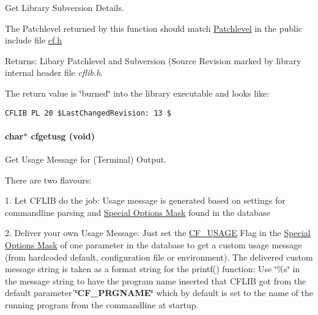 Get Library Subversion Details. 

The Patchlevel returned by this function should match \hyperlink{group__cflib__core_g0beb5d41f2b506f1c969c56731bb9490}{Patchlevel} in the public include file \hyperlink{cf_8h}{cf.h}

\begin{Desc}
\item[Returns:]Libary Patchlevel and Subversion (Source Revision marked by library internal header file {\em cflib.h\/}.\end{Desc}
The return value is \char`\"{}burned\char`\"{} into the library executable and looks like: 

\footnotesize\begin{verbatim}CFLIB PL 20 $LastChangedRevision: 13 $ \end{verbatim}
\normalsize
 \hypertarget{group__retrieval_ge272c1881db940e56c8cc364df730271}{
\paragraph[{cfgetusg}]{\setlength{\rightskip}{0pt plus 5cm}char$\ast$ cfgetusg (void)}\hfill}
\label{group__retrieval_ge272c1881db940e56c8cc364df730271}


Get Usage Message for (Terminal) Output. 

There are two flavours:

1. Let CFLIB do the job: Usage message is generated based on settings for commandline parsing and \hyperlink{group__special__options__mask}{Special Options Mask} found in the database

2. Deliver your own Usage Message: Just set the \hyperlink{group__special__options__mask_gc30981201d7455071cef38a0133b9228}{CF\_\-USAGE} Flag in the \hyperlink{group__special__options__mask}{Special Options Mask} of one parameter in the database to get a custom usage message (from hardcoded default, configuration file or environment). The delivered custom message string is taken as a format string for the printf() function: Use \char`\"{}\%s\char`\"{} in the message string to have the program name inserted that CFLIB got from the default parameter {\bf \char`\"{}CF\_\-PRGNAME\char`\"{}} which by default is set to the name of the running program from the commandline at startup.

